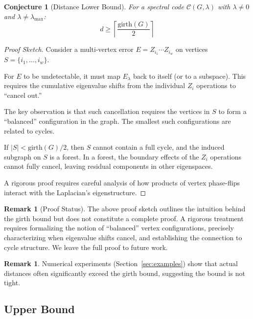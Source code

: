 \documentclass[11pt,a4paper]{article}
\newtheorem{conjecture}[theorem]{Conjecture}
\theoremstyle{definition}
\newtheorem{remark}[theorem]{Remark}
\newcommand{\gmark}{\mathrm{girth}}
\newcommand{\codespace}{\mathcal{C}}
\begin{document}
\begin{conjecture}[Distance Lower Bound]
\label{thm:girth_bound}
For a spectral code $\codespace(G, \lambda)$ with $\lambda \neq 0$ and $\lambda \neq \lambda_{\max}$:
\begin{equation}
    d \geq \left\lceil \frac{\gmark(G)}{2} \right\rceil
\end{equation}
\end{conjecture}

\begin{proof}[Proof Sketch]
Consider a multi-vertex error $E = Z_{i_1} \cdots Z_{i_w}$ on vertices $S = \{i_1, \ldots, i_w\}$.

For $E$ to be undetectable, it must map $E_\lambda$ back to itself (or to a subspace). This requires the cumulative eigenvalue shifts from the individual $Z_i$ operations to ``cancel out.''

The key observation is that such cancellation requires the vertices in $S$ to form a ``balanced'' configuration in the graph. The smallest such configurations are related to cycles.

If $|S| < \gmark(G)/2$, then $S$ cannot contain a full cycle, and the induced subgraph on $S$ is a forest. In a forest, the boundary effects of the $Z_i$ operations cannot fully cancel, leaving residual components in other eigenspaces.

A rigorous proof requires careful analysis of how products of vertex phase-flips interact with the Laplacian's eigenstructure.
\end{proof}

\begin{remark}[Proof Status]
The above proof sketch outlines the intuition behind the girth bound but does not constitute a complete proof. A rigorous treatment requires formalizing the notion of ``balanced'' vertex configurations, precisely characterizing when eigenvalue shifts cancel, and establishing the connection to cycle structure. We leave the full proof to future work.
\end{remark}

\begin{remark}
Numerical experiments (Section~\ref{sec:examples}) show that actual distances often significantly exceed the girth bound, suggesting the bound is not tight.
\end{remark}

\subsection{Upper Bound}
\end{document}
